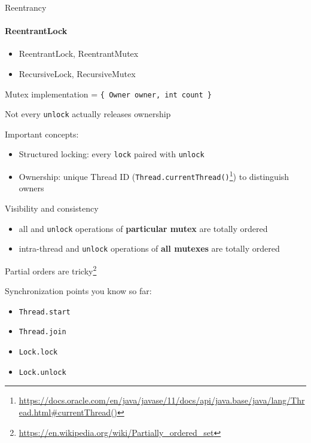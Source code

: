 \begin{frame}[t]{Reentrancy}
\framesubtitle{ReentrantLock}

\begin{itemize}
    \item ReentrantLock, ReentrantMutex
    \item RecursiveLock, RecursiveMutex
\end{itemize}

\pause

Mutex implementation = \texttt{\{ Owner owner, int count \}}

Not every \texttt{unlock} actually releases ownership

\pause
Important concepts:
\begin{itemize}
    \item Structured locking: every \texttt{lock} paired with \texttt{unlock}
    \item Ownership: unique Thread ID (\texttt{Thread.currentThread()}\footnote<3->{\tiny\url{https://docs.oracle.com/en/java/javase/11/docs/api/java.base/java/lang/Thread.html#currentThread()}}) to distinguish owners
\end{itemize}
\end{frame}


\begin{frame}{Visibility and consistency}

\begin{itemize}
    \item all  and \texttt{unlock} operations of \textbf{particular mutex} are totally ordered
    \item intra-thread  and \texttt{unlock} operations of \textbf{all mutexes} are totally ordered
\end{itemize}

\pause
Partial orders are tricky\footnote<2->{\url{https://en.wikipedia.org/wiki/Partially_ordered_set}}

\pause
Synchronization points you know so far:
\begin{itemize}
    \item \texttt{Thread.start}
    \item \texttt{Thread.join}
    \item \texttt{Lock.lock}
    \item \texttt{Lock.unlock}
\end{itemize}
\end{frame}

